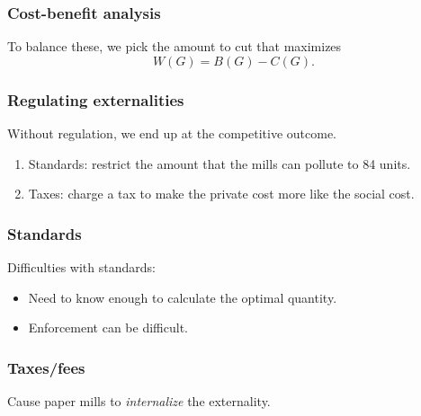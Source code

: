 \documentclass[xcolor=pdftex,dvipsnames]{beamer}
\begin{document}
\begin{frame}
  \frametitle{Cost-benefit analysis}
  To balance these, we pick the amount to cut that maximizes
\[
W(G) = B(G) - C(G).
\]

\end{frame}

\begin{frame}
  \frametitle{Regulating externalities}
  Without regulation, we end up at the competitive outcome.

\bigskip
{}

\bigskip
{}
\bigskip

\begin{enumerate}
\item<5-> Standards: restrict the amount that the mills can pollute to
  84 units.
\item <6-> Taxes: charge a tax to make the private cost more like the
  social cost.
\end{enumerate}

\end{frame}

\begin{frame}
  \frametitle{Standards}
  Difficulties with standards:
  \begin{itemize}
    \item Need to know enough to calculate the optimal quantity. 
    \item Enforcement can be difficult.
  \end{itemize}
\end{frame}


\begin{frame}
  \frametitle{Taxes/fees}
  Cause paper mills to \emph{internalize} the externality.

\bigskip
{}
\bigskip




\end{frame}
\end{document}
